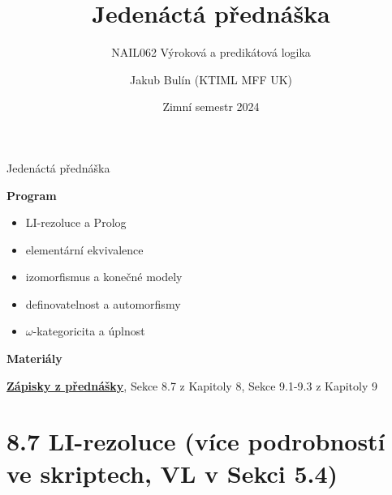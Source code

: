 \documentclass{beamer}
\title{Jedenáctá přednáška}
\subtitle{NAIL062 Výroková a predikátová logika}
\author{Jakub Bulín (KTIML MFF UK)}
\date{Zimní semestr 2024}
\begin{document}
\maketitle


\begin{frame}{Jedenáctá přednáška}

    \textbf{Program}
        \begin{itemize}            
            \item LI-rezoluce a Prolog
            \item elementární ekvivalence
            \item izomorfismus a konečné modely
            \item definovatelnost a automorfismy
            \item $\omega$-kategoricita a úplnost
        \end{itemize}

    \textbf{Materiály}

        \href{https://github.com/jbulin-mff-uk/nail062/raw/main/lecture/lecture-notes/lecture-notes.pdf}{\alert{\textbf{Zápisky z přednášky}}}, Sekce 8.7 z Kapitoly 8, Sekce 9.1-9.3 z Kapitoly 9

\end{frame}


\section{8.7 LI-rezoluce (více podrobností ve skriptech, VL v Sekci 5.4)}
\end{document}
